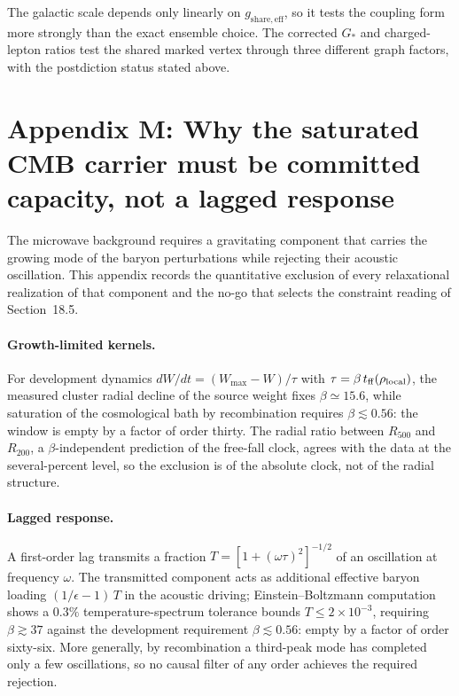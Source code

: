 \documentclass[11pt]{article}
\begin{document}
The galactic scale depends only linearly on $g_{\mathrm{share,eff}}$, so it tests the coupling form more strongly than the exact ensemble choice. The corrected $G_*$ and charged-lepton ratios test the shared marked vertex through three different graph factors, with the postdiction status stated above.

\section*{Appendix M: Why the saturated CMB carrier must be committed capacity, not a lagged response}

The microwave background requires a gravitating component that carries the growing mode of the baryon perturbations while rejecting their acoustic oscillation. This appendix records the quantitative exclusion of every relaxational realization of that component and the no-go that selects the constraint reading of Section~18.5.

\paragraph{Growth-limited kernels.} For development dynamics $dW/dt=(W_{\max}-W)/\tau$ with $\tau=\beta\,t_{\rm ff}(\rho_{\rm local})$, the measured cluster radial decline of the source weight fixes $\beta\simeq15.6$, while saturation of the cosmological bath by recombination requires $\beta\lesssim0.56$: the window is empty by a factor of order thirty. The radial ratio between $R_{500}$ and $R_{200}$, a $\beta$-independent prediction of the free-fall clock, agrees with the data at the several-percent level, so the exclusion is of the absolute clock, not of the radial structure.

\paragraph{Lagged response.} A first-order lag transmits a fraction $T=[1+(\omega\tau)^2]^{-1/2}$ of an oscillation at frequency $\omega$. The transmitted component acts as additional effective baryon loading $(1/\epsilon-1)\,T$ in the acoustic driving; Einstein--Boltzmann computation shows a $0.3\%$ temperature-spectrum tolerance bounds $T\le2\times10^{-3}$, requiring $\beta\gtrsim37$ against the development requirement $\beta\lesssim0.56$: empty by a factor of order sixty-six. More generally, by recombination a third-peak mode has completed only a few oscillations, so no causal filter of any order achieves the required rejection.
\end{document}
